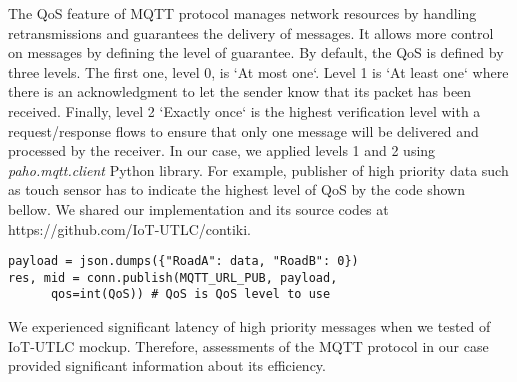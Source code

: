 The QoS feature of MQTT protocol manages network resources by handling retransmissions and guarantees the delivery of messages. It allows more control on messages by defining the level of guarantee. By default, the QoS is defined by three levels. The first one, level 0, is `At most one`. Level 1 is `At least one` where there is an acknowledgment to let the sender know that its packet has been received. Finally, level 2 `Exactly once` is the highest verification level with a request/response flows to ensure that only one message will be delivered and processed by the receiver. In our case, we applied levels 1 and 2 using \textit{paho.mqtt.client} Python library.  
%
For example, publisher of high priority data such as touch sensor has to indicate the highest level of QoS by the code shown bellow. 
We shared our implementation and its source codes at https://github.com/IoT-UTLC/contiki.
%

\begin{footnotesize}
\begin{lstlisting}
payload = json.dumps({"RoadA": data, "RoadB": 0})
res, mid = conn.publish(MQTT_URL_PUB, payload,
	  qos=int(QoS)) # QoS is QoS level to use 
\end{lstlisting}
\end{footnotesize}


                                                                                                                                                        
We experienced significant latency of high priority messages when we tested of IoT-UTLC mockup. Therefore, assessments of the MQTT protocol in our case provided significant information about its efficiency. 

